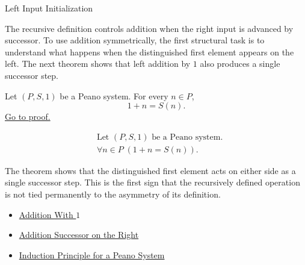 \begin{topicbox}{Left Input Initialization}
\begin{exposition}
The recursive definition controls addition when the right input is advanced by
successor. To use addition symmetrically, the first structural task is to
understand what happens when the distinguished first element appears on the
left. The next theorem shows that left addition by $1$ also produces a single
successor step.
\end{exposition}

\begin{tcolorbox}[colback=thmbox, colframe=thmborder, arc=2pt,
  left=6pt, right=6pt, top=4pt, bottom=4pt,
  title={\small\textbf{Theorem (One Plus \texorpdfstring{$n$}{n})}},
  fonttitle=\small\bfseries]
\begin{theorem}
\label{thm:one-plus-n}
Let $(P,S,1)$ be a Peano system. For every $n \in P$,
\[
1+n=S(n).
\]
\hyperref[prf:one-plus-n]{Go to proof.}
\end{theorem}
\end{tcolorbox}

\begin{remark*}
\[
\begin{aligned}
&\text{Let } (P,S,1) \text{ be a Peano system.}\\
&\forall n \in P\;(1+n=S(n)).
\end{aligned}
\]
\end{remark*}

\begin{remark*}[Interpretation]
The theorem shows that the distinguished first element acts on either side as
a single successor step. This is the first sign that the recursively defined
operation is not tied permanently to the asymmetry of its definition.
\end{remark*}

\begin{dependencies}
\begin{itemize}
  \item \hyperref[thm:addition-with-one]{Addition With $1$}
  \item \hyperref[thm:addition-successor-on-right]{Addition Successor on the Right}
  \item \hyperref[thm:induction-principle-for-peano-system]{Induction Principle for a Peano System}
\end{itemize}
\end{dependencies}
\end{topicbox}

